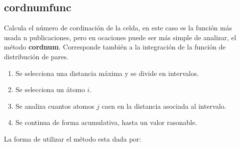 
\subsection{cordnumfunc}
Calcula el n\'umero de cordinaci\'on de la celda, en este caso es la funci\'on
m\'as usada n publicaciones, pero en ocaciones puede ser m\'as simple de
analizar, el m\'etodo \textbf{cordnum}. Corresponde tambi\'en a la integraci\'on
de la funci\'on de distribuci\'on de pares.
\begin{enumerate}
 \item Se selecciona una distancia m\'axima y se divide en intervalos.
 \item Se selecciona un \'atomo $i$.
 \item Se analiza cuantos atomos $j$ caen en la distancia asociada al intervalo.
 \item Se continua de forma acumulativa, hasta un valor rasonable.
\end{enumerate}

La forma de utilizar el m\'etodo esta dada por:


